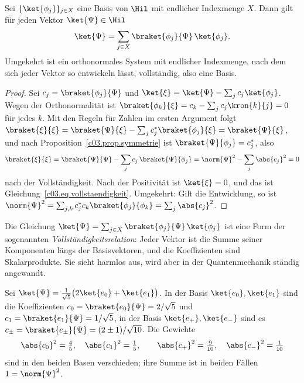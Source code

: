 \begin{proposition}\label{c03.prop.entwicklung}
  Sei $\{\ket{\phi_j}\}_{j \in X}$ eine Basis von $\Hil$ mit endlicher Indexmenge $X$. Dann
  gilt für jeden Vektor $\ket{\Psi} \in \Hil$
  \begin{equation}\label{c03.eq.vollstaendigkeit}
    \ket{\Psi} = \sum_{j \in X} \braket{\phi_j}{\Psi}\, \ket{\phi_j} .
  \end{equation}
  Umgekehrt ist ein orthonormales System mit endlicher Indexmenge, nach dem sich jeder Vektor
  so entwickeln lässt, vollständig, also eine Basis.
\end{proposition}
\begin{proof}
  Sei $c_j = \braket{\phi_j}{\Psi}$ und $\ket{\xi} = \ket{\Psi} - \sum_j c_j \ket{\phi_j}$.
  Wegen der Orthonormalität ist $\braket{\phi_k}{\xi} = c_k - \sum_j c_j \kron{k}{j} = 0$ für
  jedes $k$. Mit den Regeln für Zahlen im ersten Argument folgt
  $\braket{\xi}{\xi} = \braket{\Psi}{\xi} - \sum_j c_j^* \braket{\phi_j}{\xi} = \braket{\Psi}{\xi}$,
  und nach Proposition~\ref{c03.prop.symmetrie} ist $\braket{\Psi}{\phi_j} = c_j^*$, also
  \begin{equation}\label{c03.eq.entwicklung-beweis}
    \braket{\xi}{\xi} = \braket{\Psi}{\Psi} - \sum_{j} c_j\, \braket{\Psi}{\phi_j}
    = \norm{\Psi}^2 - \sum_{j} \abs{c_j}^2 = 0
  \end{equation}
  nach der Vollständigkeit. Nach der Positivität ist $\ket{\xi} = 0$, und das ist
  Gleichung~\eqref{c03.eq.vollstaendigkeit}. Umgekehrt: Gilt die Entwicklung, so ist
  $\norm{\Psi}^2 = \sum_{j,k} c_j^* c_k \braket{\phi_j}{\phi_k} = \sum_j \abs{c_j}^2$.
\end{proof}

\begin{merksatz}[Vollständigkeitsrelation]
  Die Gleichung
  $\ket{\Psi} = \sum_{j \in X} \braket{\phi_j}{\Psi}\, \ket{\phi_j}$ ist eine Form der
  sogenannten \emph{Vollständigkeitsrelation}: Jeder Vektor ist die Summe seiner Komponenten
  längs der Basisvektoren, und die Koeffizienten sind Skalarprodukte. Sie sieht harmlos aus,
  wird aber in der Quantenmechanik ständig angewandt.
\end{merksatz}

\begin{example}\label{c03.ex.zwei-basen}
  Sei $\ket{\Psi} = \tfrac{1}{\sqrt{5}} \bigl( 2 \ket{e_0} + \ket{e_1} \bigr)$. In der Basis
  $\ket{e_0}, \ket{e_1}$ sind die Koeffizienten $c_0 = \braket{e_0}{\Psi} = 2/\sqrt{5}$ und
  $c_1 = \braket{e_1}{\Psi} = 1/\sqrt{5}$, in der Basis $\ket{e_+}, \ket{e_-}$ sind es
  $c_\pm = \braket{e_\pm}{\Psi} = (2 \pm 1)/\sqrt{10}$. Die Gewichte
  \begin{equation}\label{c03.eq.gewichte}
    \abs{c_0}^2 = \tfrac45 , \quad \abs{c_1}^2 = \tfrac15 ,
    \qquad
    \abs{c_+}^2 = \tfrac{9}{10} , \quad \abs{c_-}^2 = \tfrac{1}{10}
  \end{equation}
  sind in den beiden Basen verschieden; ihre Summe ist in beiden Fällen $1 = \norm{\Psi}^2$.
\end{example}

